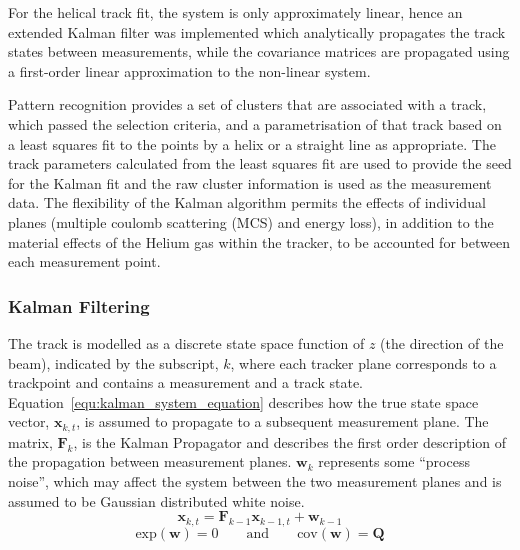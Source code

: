    For the helical track fit, the system is only approximately linear, hence an extended Kalman filter was implemented which analytically propagates the track states between measurements, while the covariance matrices are propagated using a first-order linear approximation to the non-linear system.

   Pattern recognition provides a set of clusters that are associated with a track, which passed the selection criteria, and a parametrisation of that track based on a least squares fit to the points by a helix or a straight line as appropriate. The track parameters calculated from the least squares fit are used to provide the seed for the Kalman fit and the raw cluster information is used as the measurement data. The flexibility of the Kalman algorithm permits the effects of individual planes (multiple coulomb scattering (MCS) and energy loss), in addition to the material effects of the Helium gas within the tracker, to be accounted for between each measurement point.

     \subsubsection{Kalman Filtering}

     The track is modelled as a discrete state space function of $z$ (the direction of the beam), indicated by the subscript, $k$, where each tracker plane corresponds to a trackpoint and contains a measurement and a track state. Equation~\ref{equ:kalman_system_equation} describes how the true state space vector, $\mathbf{x}_{k,t}$, is assumed to propagate to a subsequent measurement plane. The matrix, $\mathbf{F}_k$, is the Kalman Propagator and describes the first order description of the propagation between measurement planes. $\mathbf{w}_k$ represents some ``process noise'', which may affect the system between the two measurement planes and is assumed to be Gaussian distributed white noise.
    \begin{equation}
      \mathbf{x}_{k,t} = \mathbf{F}_{k-1}\mathbf{x}_{k-1,t} + \mathbf{w}_{k-1}
      \label{equ:kalman_system_equation}
    \end{equation}
    \begin{equation*}
      \textrm{exp}(\mathbf{w}) = 0 \quad\quad \textrm{and} \quad\quad \textrm{cov}(\mathbf{w}) = \mathbf{Q}
    \end{equation*}
     
